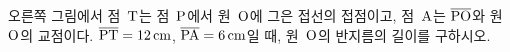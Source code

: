 \noindent\begin{minipage}[t]{0.58\linewidth}\vspace{0pt}\raggedright 오른쪽 그림에서 점~$\mathrm{T}$는 점~$\mathrm{P}$에서 원~$\mathrm{O}$에 그은 접선의 접점이고, 점~$\mathrm{A}$는 $\overline{\mathrm{PO}}$와 원~$\mathrm{O}$의 교점이다. $\overline{\mathrm{PT}}=12\,\mathrm{cm}$, $\overline{\mathrm{PA}}=6\,\mathrm{cm}$일 때, 원~$\mathrm{O}$의 반지름의 길이를 구하시오.\end{minipage}\hfill\begin{minipage}[t]{0.4\linewidth}\vspace{0pt}\centering \resizebox{\ifdim\width>\linewidth\linewidth\else\width\fi}{!}{}\end{minipage}\par
